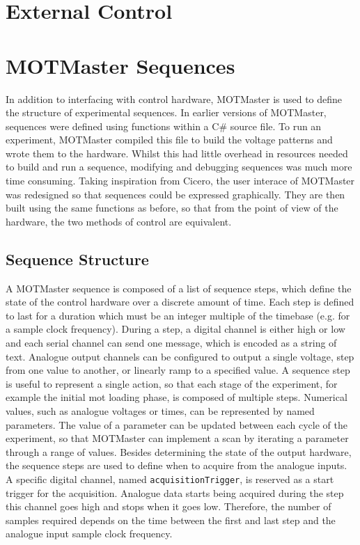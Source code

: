 \section{External Control}

\section{MOTMaster Sequences}
In addition to interfacing with control hardware, MOTMaster is used to define the structure of experimental sequences. In earlier versions of MOTMaster, sequences were defined using functions within a C\# source file. To run an experiment, MOTMaster compiled this file to build the voltage patterns and wrote them to the hardware. Whilst this had little overhead in resources needed to build and run a sequence, modifying and debugging sequences was much more time consuming. Taking inspiration from Cicero, the user interace of MOTMaster was redesigned so that sequences could be expressed graphically. They are then built using the same functions as before, so that from the point of view of the hardware, the two methods of control are equivalent. 

\subsection{Sequence Structure}
A MOTMaster sequence is composed of a list of sequence steps, which define the state of the control hardware over a discrete amount of time. Each step is defined to last for a duration which must be an integer multiple of the timebase (e.g.  for a  sample clock frequency). During a step, a digital channel is either high or low and each serial channel can send one message, which is encoded as a string of text. Analogue output channels can be configured to output a single voltage, step from one value to another, or linearly ramp to a specified value. A sequence step is useful to represent a single action, so that each stage of the experiment, for example the initial \ac{mot} loading phase, is composed of multiple steps. Numerical values, such as analogue voltages or times, can be represented by named parameters. The value of a parameter can be updated between each cycle of the experiment, so that MOTMaster can implement a scan by iterating a parameter through a range of values. Besides determining the state of the output hardware, the sequence steps are used to define when to acquire from the analogue inputs. A specific digital channel, named \verb|acquisitionTrigger|, is reserved as a start trigger for the acquisition. Analogue data starts being acquired during the step this channel goes high and stops when it goes low. Therefore, the number of samples required depends on the time between the first and last step and the analogue input sample clock frequency.
